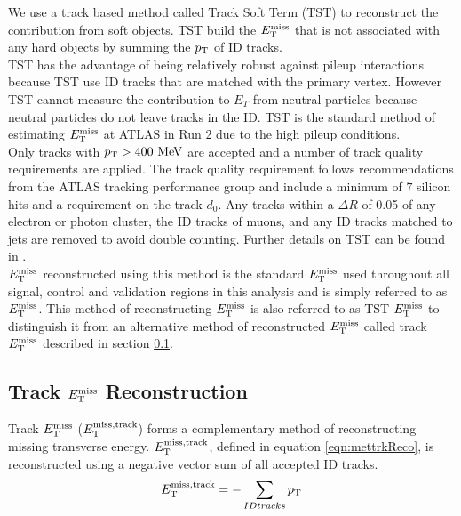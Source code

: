 \indent We use a track based method called Track Soft Term (TST) \cite{METReco} to reconstruct the contribution from soft objects.  TST build the $E_{\mathrm{T}}^{\mathrm{miss}}$ that is not associated with any hard objects by summing the $p_{\mathrm{T}}$ of ID tracks. \\

\indent TST has the advantage of being relatively robust against pileup interactions because TST use ID tracks that are matched with the primary vertex. However TST cannot measure the contribution to $E_T$ from neutral particles because neutral particles do not leave tracks in the ID.  TST is the standard method of estimating $E_{\mathrm{T}}^{\mathrm{miss}}$ at ATLAS in Run 2 due to the high pileup conditions. \\

\indent  Only tracks with $\pt > 400 \mev$ are accepted and a number of track quality requirements are applied.  The track quality requirement follows recommendations from the ATLAS tracking performance group and include a minimum of $7$ silicon hits and a requirement on the track $d_0$.  Any tracks within a $\Delta R$ of 0.05 of any electron or photon cluster, the ID tracks of muons, and any ID tracks matched to jets are removed to avoid double counting.  Further details on TST can be found in \cite{METReco}.  \\

\indent $E_{\mathrm{T}}^{\mathrm{miss}}$ reconstructed using this method is the standard $E_{\mathrm{T}}^{\mathrm{miss}}$ used throughout all signal, control and validation regions in this analysis and is simply referred to as $E_{\mathrm{T}}^{\mathrm{miss}}$.  This method of reconstructing $E_{\mathrm{T}}^{\mathrm{miss}}$ is also referred to as TST $E_{\mathrm{T}}^{\mathrm{miss}}$ to distinguish it from an alternative method of reconstructed $E_{\mathrm{T}}^{\mathrm{miss}}$ called track $E_{\mathrm{T}}^{\mathrm{miss}}$ described in section \ref{sec:reco:trkMET}. \\

\subsection{Track $E_{\mathrm{T}}^{\mathrm{miss}}$ Reconstruction}
\label{sec:reco:trkMET}

\indent Track $E_{\mathrm{T}}^{\mathrm{miss}}$ ($E_{\mathrm{T}}^{\mathrm{miss, track}}$) forms a complementary method of reconstructing missing transverse energy.  $E_{\mathrm{T}}^{\mathrm{miss, track}}$, defined in equation \ref{eqn:mettrkReco}, is reconstructed using a negative vector sum of all accepted ID tracks.  \\

\begin{equation}
E_{\mathrm{T}}^{\mathrm{miss, track}} = - \sum_{ID tracks} p_{\mathrm{T}}  
\label{eqn:mettrkReco}
\end{equation}

